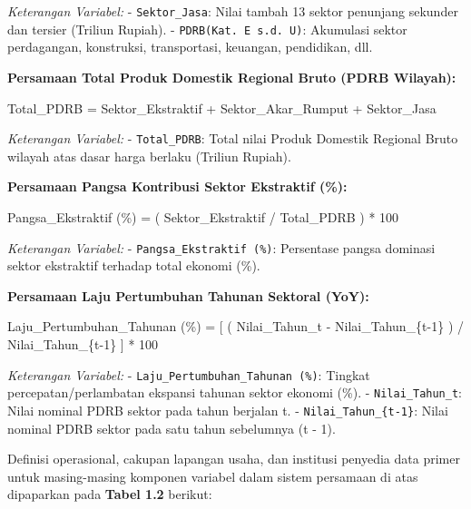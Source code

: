 \documentclass[
]{article}
\newenvironment{Shaded}{}{}
\newcommand{\NormalTok}[1]{#1}
\begin{document}
\emph{Keterangan Variabel:} - \texttt{Sektor\_Jasa}: Nilai tambah 13
sektor penunjang sekunder dan tersier (Triliun Rupiah). -
\texttt{PDRB(Kat.\ E\ s.d.\ U)}: Akumulasi sektor perdagangan,
konstruksi, transportasi, keuangan, pendidikan, dll.

\textbf{Persamaan Total Produk Domestik Regional Bruto (PDRB Wilayah):}

\begin{Shaded}
\begin{Highlighting}[]
\NormalTok{Total\_PDRB = Sektor\_Ekstraktif + Sektor\_Akar\_Rumput + Sektor\_Jasa}
\end{Highlighting}
\end{Shaded}

\emph{Keterangan Variabel:} - \texttt{Total\_PDRB}: Total nilai Produk
Domestik Regional Bruto wilayah atas dasar harga berlaku (Triliun
Rupiah).

\textbf{Persamaan Pangsa Kontribusi Sektor Ekstraktif (\%):}

\begin{Shaded}
\begin{Highlighting}[]
\NormalTok{Pangsa\_Ekstraktif (\%) = ( Sektor\_Ekstraktif / Total\_PDRB ) * 100}
\end{Highlighting}
\end{Shaded}

\emph{Keterangan Variabel:} - \texttt{Pangsa\_Ekstraktif\ (\%)}:
Persentase pangsa dominasi sektor ekstraktif terhadap total ekonomi
(\%).

\textbf{Persamaan Laju Pertumbuhan Tahunan Sektoral (YoY):}

\begin{Shaded}
\begin{Highlighting}[]
\NormalTok{Laju\_Pertumbuhan\_Tahunan (\%) = [ ( Nilai\_Tahun\_t {-} Nilai\_Tahun\_\{t{-}1\} ) / Nilai\_Tahun\_\{t{-}1\} ] * 100}
\end{Highlighting}
\end{Shaded}

\emph{Keterangan Variabel:} - \texttt{Laju\_Pertumbuhan\_Tahunan\ (\%)}:
Tingkat percepatan/perlambatan ekspansi tahunan sektor ekonomi (\%). -
\texttt{Nilai\_Tahun\_t}: Nilai nominal PDRB sektor pada tahun berjalan
t. - \texttt{Nilai\_Tahun\_\{t-1\}}: Nilai nominal PDRB sektor pada satu
tahun sebelumnya (t - 1).

Definisi operasional, cakupan lapangan usaha, dan institusi penyedia
data primer untuk masing-masing komponen variabel dalam sistem persamaan
di atas dipaparkan pada \textbf{Tabel 1.2} berikut:
\end{document}

